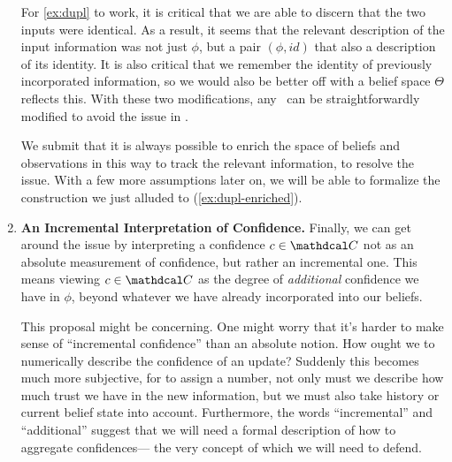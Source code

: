 \begin{enumerate}[label={\textbf{I\arabic*.}},ref={I\arabic*}]
	For \cref{ex:dupl} to work, it is critical that we are able to discern that the two inputs were identical.
	As a result, it seems that the relevant description of the input information was not just $\phi$, but a pair $(\phi, \mathit{id})$ that also a description of its identity.
	It is also critical that we remember the identity of previously incorporated information, so we would also be better off with a belief space $\Theta$ reflects this.
	With these two modifications, any \cofunc\ can be straightforwardly modified to avoid the issue in .


	We submit that it is always possible to enrich the space of beliefs and observations in this way to track the relevant information, to resolve the issue.
	With a few more assumptions later on, we will be able to formalize the construction we just alluded to (\cref{ex:dupl-enriched}).

	\item \textbf{An Incremental Interpretation of Confidence.}
		\label{approach:interperet}
	Finally, we can get around the issue by interpreting a confidence $c \in \confdom$ not as an absolute measurement of confidence, but rather an incremental one.  This means viewing $c \in \confdom$ as the degree of \emph{additional} confidence we have in $\phi$, beyond whatever we have already incorporated into our beliefs.

	This proposal might be concerning.
	One might worry that it's harder to make sense of ``incremental confidence'' than an absolute notion.
	How ought we to numerically describe the confidence of an update?
	Suddenly this becomes much more subjective, for to assign a number, not only must we describe how much trust we have in the new information, but we must also take history or current belief state into account.
	Furthermore, the words ``incremental'' and ``additional'' suggest that we will need a formal description of how to aggregate confidences---%
	the very concept of which we will need to defend.


\end{enumerate}
